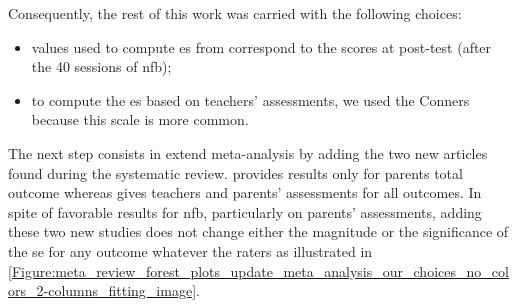 \begin{table}[h!]
  \centering
  \caption{Comparison between \citet{Cortese2016} results obtained with RevMan \citep{RevMan} and those obtained with the Python code with our 
	choices applied ($^a$ post-test values for \citeauthor{Arnold2014} are obtained after 40 sessions of \gls{nfb} and Conners scale is used for \citeauthor{Steiner2014}
	teachers' outcomes). \glspl{se} and their corresponding p-value (in parenthesis) are presented. With the Python program, a negative \gls{se}
	is in favor of \gls{nfb} unlike \citeauthor{Cortese2016}.}

  \label{Table:meta_review_comparison_revman_and_python_with_choices}
\end{table}

Consequently, the rest of this work was carried with the following choices:
\begin{itemize}
    \item values used to compute \gls{es} from \citeauthor{Arnold2014} correspond to the scores at post-test (after the 40 sessions of \gls{nfb});  
    \item to compute the \gls{es} based on teachers' assessments, we used the Conners because this scale is more common.
\end{itemize}

The next step consists in extend \citeauthor{Cortese2016} meta-analysis by adding the two new articles \citep{Strehl2017, Baumeister2016} found 
during the systematic review. \citet{Baumeister2016} provides results only for parents total outcome whereas \citet{Strehl2017} gives teachers 
and parents' assessments for all outcomes. In spite of favorable results for \gls{nfb}, particularly on parents' assessments, adding these two 
new studies does not change either the magnitude or the significance of the \gls{se} for any outcome whatever the raters
as illustrated in \cref{Figure:meta_review_forest_plots_update_meta_analysis_our_choices_no_colors_2-columns_fitting_image}. 
 
